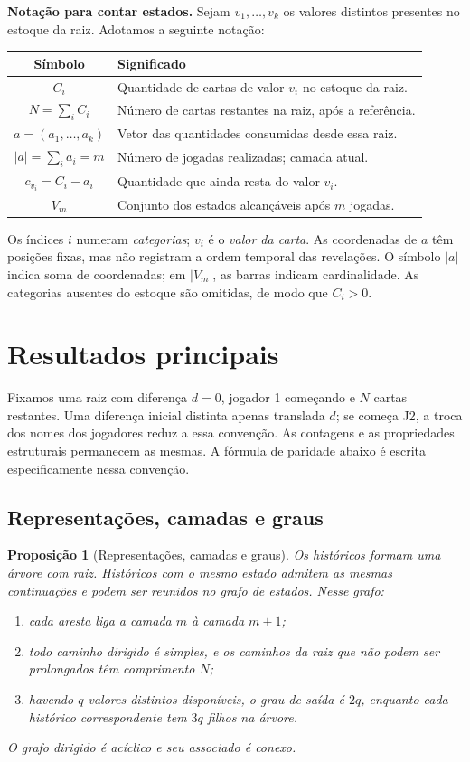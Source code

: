 \documentclass[11pt,a4paper]{article}
\newtheorem{proposicao}{Proposição}[section]
\theoremstyle{definition}
\newcommand{\destaque}[1]{\par\smallskip\noindent\textbf{#1}\enspace}
\newcommand{\proxpagina}{\newpage}
\begin{document}
\destaque{Notação para contar estados.}
Sejam $v_1,\ldots,v_k$ os valores distintos presentes no estoque da raiz. Adotamos a seguinte notação:
\begin{center}
\begin{tabular}{@{}cl@{}}
\toprule
Símbolo & Significado\\
\midrule
$C_i$ & Quantidade de cartas de valor $v_i$ no estoque da raiz.\\
$N=\sum_i C_i$ & Número de cartas restantes na raiz, após a referência.\\
$a=(a_1,\ldots,a_k)$ & Vetor das quantidades consumidas desde essa raiz.\\
$|a|=\sum_i a_i=m$ & Número de jogadas realizadas; camada atual.\\
$c_{v_i}=C_i-a_i$ & Quantidade que ainda resta do valor $v_i$.\\
$V_m$ & Conjunto dos estados alcançáveis após $m$ jogadas.\\
\bottomrule
\end{tabular}
\end{center}
Os índices $i$ numeram \emph{categorias}; $v_i$ é o \emph{valor da carta}. As coordenadas de $a$ têm posições fixas, mas não registram a ordem temporal das revelações. O símbolo $|a|$ indica soma de coordenadas; em $|V_m|$, as barras indicam cardinalidade. As categorias ausentes do estoque são omitidas, de modo que $C_i>0$.

\proxpagina
\section{Resultados principais}
Fixamos uma raiz com diferença $d=0$, jogador 1 começando e $N$ cartas restantes. Uma diferença inicial distinta apenas translada $d$; se começa J2, a troca dos nomes dos jogadores reduz a essa convenção. As contagens e as propriedades estruturais permanecem as mesmas. A fórmula de paridade abaixo é escrita especificamente nessa convenção.

\subsection{Representações, camadas e graus}
\begin{proposicao}[Representações, camadas e graus]\label{prop:representacoes}
Os históricos formam uma árvore com raiz. Históricos com o mesmo estado admitem as mesmas continuações e podem ser reunidos no grafo de estados. Nesse grafo:
\begin{enumerate}[label=\roman*)]
\item cada aresta liga a camada $m$ à camada $m+1$;
\item todo caminho dirigido é simples, e os caminhos da raiz que não podem ser prolongados têm comprimento $N$;
\item havendo $q$ valores distintos disponíveis, o grau de saída é $2q$, enquanto cada histórico correspondente tem $3q$ filhos na árvore.
\end{enumerate}
O grafo dirigido é acíclico e seu associado é conexo.
\end{proposicao}
\end{document}
